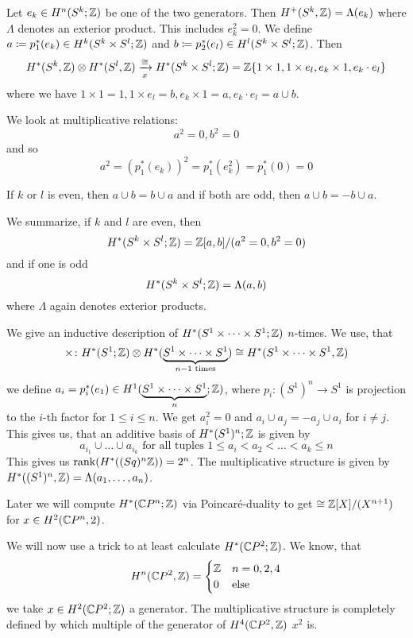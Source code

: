 \documentclass[language=english]{TemplateLecture}
\begin{document}
Let \(e_k \in H^n(S^k; \mathbb{Z})\) be one of the two generators. Then \(H^+(S^k, \mathbb{Z}) = \Lambda(e_k)\) where \(\Lambda\) denotes an exterior product. This includes \(e_k^2 = 0\). We define \(a \coloneq p_1^*(e_k) \in H^k(S^k \times S^l; \mathbb{Z})\) and \(b\coloneq p_2^*(e_l) \in H^l(S^k \times S^l; \mathbb{Z})\). Then 
\[H^*(S^k, \mathbb{Z}) \otimes H^*(S^l, \mathbb{Z}) \xrightarrow[x]{\cong} H^*(S^k \times S^l; \mathbb{Z}) = \mathbb{Z}\{1 \times 1, 1 \times e_l, e_k \times 1, e_k \cdot e_l\}\]
where we have \(1\times 1 = 1, 1 \times e_l = b, e_k \times 1 = a, e_k \cdot e_l = a\cup b\).

We look at multiplicative relations:
\[a^2 = 0, b^2 = 0\]
and so
\[a^2 = (p_1^*(e_k))^2 = p_1^*(e_k^2) = p_1^*(0) = 0\]

If \(k \) or \(l\) is even, then \(a \cup b = b\cup a\) and if both are odd, then \(a\cup b = - b\cup a\).

We summarize, if \(k\) and \(l\) are even, then
\[H^*(S^k \times S^l; \mathbb{Z}) = \mathbb{Z}[a,b]/(a^2 = 0, b^2 = 0)\]
and if one is odd
\[H^*(S^k \times S^l; \mathbb{Z}) = \Lambda(a,b)\]
where \(\Lambda\) again denotes exterior products.


We give an inductive description of  \(H^*(S^1 \times \dots \times S^1; \mathbb{Z})\) \(n\)-times. We use, that
\[\times \colon H^*(S^1; \mathbb{Z}) \otimes H^*(\underbrace{S^1 \times \dots \times S^1}_{n-1 \text{ times}}) \cong H^*(S^1\times \dots \times S^1, \mathbb{Z})\]
 we define \(a_i = p_i^*(e_1) \in H^1(\underbrace{S^1 \times \dots \times S^1}_{n}; \mathbb{Z})\), where \(p_i \colon (S^1)^n \to S^1\) is projection to the \(i\)-th factor for \(1 \leq i \leq n\). We get \(a_i^2 = 0\) and \(a_i \cup a_j = - a_j \cup a_i\) for \(i \neq j\). This gives us, that an additive basis of \(H^*(S^1)^n; \mathbb{Z}\) is given by
 \[a_{i_1} \cup \dots \cup a_{i_k} \text{ for all tuples } 1 \leq a_i < a_2 < \dots < a_k \leq n\]
 This gives us \(\mathrm{rank}(H^*((S^^1)^n \IZ)) = 2^n\).
 The multiplicative structure is given by \(H^*((S^1)^n, \mathbb{Z}) = \Lambda(a_1, \dots, a_n)\).

 Later we will compute \(H^*(\mathbb{C} P^n; \mathbb{Z})\) via Poincaré-duality to get \(\cong \mathbb{Z}[X]/(X^{n+1})\) for \(x \in H^2(\mathbb{C} P^n, 2)\).

 We will now use a trick to at least calculate \(H^*(\mathbb{C} P^2; \mathbb{Z})\). We know, that
 \[H^n(\mathbb{C} P^2, \mathbb{Z}) = \begin{cases}
    \mathbb{Z} & n = 0,2,4 \\
    0 & \text{else}
 \end{cases}\]
 we take \(x \in H^2(\mathbb{C} P^2; \mathbb{Z})\) a generator. The multiplicative structure is completely defined by which multiple of the generator of \(H^4(\mathbb{C} P^2, \mathbb{Z})\) \(x^2\) is.
\end{document}
